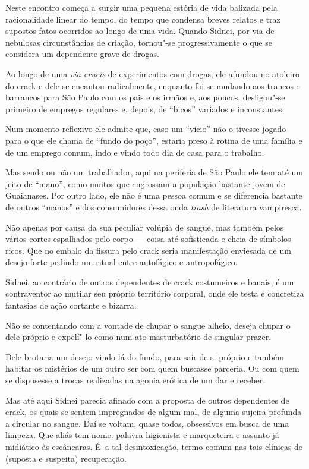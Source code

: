 \asterisc{}

Neste encontro começa a surgir uma pequena estória de vida balizada pela
racionalidade linear do tempo, do tempo que condensa breves relatos e
traz supostos fatos ocorridos ao longo de uma vida. Quando Sidnei, por
via de nebulosas circunstâncias de criação, tornou"-se progressivamente o
que se considera um dependente grave de drogas.

Ao longo de uma \emph{via crucis} de experimentos com drogas, ele
afundou no atoleiro do crack e dele se encantou radicalmente, enquanto
foi se mudando aos trancos e barrancos para São Paulo com os pais e os
irmãos e, aos poucos, desligou"-se primeiro de empregos regulares e,
depois, de ``bicos'' variados e inconstantes.

Num momento reflexivo ele admite que, caso um ``vício'' não o tivesse
jogado para o que ele chama de ``fundo do poço'', estaria preso à rotina
de uma família e de um emprego comum, indo e vindo todo dia de casa para
o trabalho.

Mas sendo ou não um trabalhador, aqui na periferia de São Paulo ele tem
até um jeito de ``mano'', como muitos que engrossam a população bastante
jovem de Guaianases. Por outro lado, ele não é uma pessoa comum e se
diferencia bastante de outros ``manos'' e dos consumidores dessa onda
\emph{trash} de literatura vampiresca.

Não apenas por causa da sua peculiar volúpia de sangue, mas também pelos
vários cortes espalhados pelo corpo --- coisa até sofisticada e cheia de
símbolos ricos. Que no embalo da fissura pelo crack seria manifestação
enviesada de um desejo forte pedindo um ritual entre autofágico e
antropofágico.

Sidnei, ao contrário de outros dependentes de crack costumeiros e
banais, é um contraventor ao mutilar seu próprio território corporal, onde ele testa e concretiza fantasias de ação cortante e bizarra.

Não se contentando com a vontade de chupar o sangue alheio, deseja
chupar o dele próprio e expelí"-lo como num ato masturbatório de singular
prazer.

Dele brotaria um desejo vindo lá do fundo, para sair de si próprio e
também habitar os mistérios de um outro ser com quem buscasse parceria.
Ou com quem se dispusesse a trocas realizadas na agonia erótica de um
dar e receber.

Mas até aqui Sidnei parecia afinado com a proposta de outros dependentes
de crack, os quais se sentem impregnados de algum mal, de alguma sujeira
profunda a circular no sangue. Daí se voltam, quase todos, obsessivos em
busca de uma limpeza. Que aliás tem nome: palavra higienista e
marqueteira e assunto já midiático às escâncaras. É~a tal
desintoxicação, termo comum nas tais clínicas de (suposta e suspeita)
recuperação.

